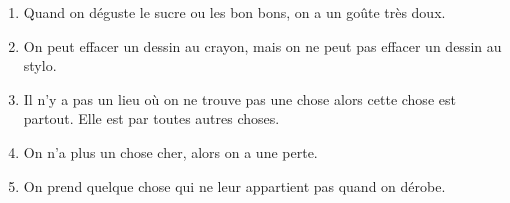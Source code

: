 \documentclass[letterpaper]{article}
\begin{document}
\doublespacing
\begin{enumerate}
\item
  Quand on déguste le sucre ou les bon bons, on a un goûte très doux.
\item
  On peut effacer un dessin au crayon, mais on ne peut pas effacer un dessin au stylo.
\item
  Il n'y a pas un lieu où on ne trouve pas une chose alors cette chose est partout. Elle est par toutes autres choses.
\item
  On n'a plus un chose cher, alors on a une perte.
\item
  On prend quelque chose qui ne leur appartient pas quand on dérobe.
\end{enumerate}
\end{document}
